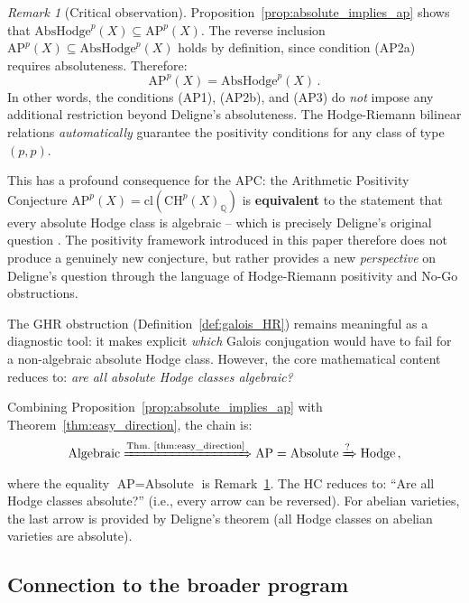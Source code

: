 \documentclass[aps,prd,twocolumn,superscriptaddress,nofootinbib]{revtex4-2}
\theoremstyle{definition}
\theoremstyle{remark}
\newtheorem{remark}[theorem]{Remark}
\begin{document}
\begin{remark}[Critical observation]
\label{rem:ap_equals_absolute}
Proposition~\ref{prop:absolute_implies_ap} shows that $\mathrm{AbsHodge}^p(X) \subseteq \mathrm{AP}^p(X)$. The reverse inclusion $\mathrm{AP}^p(X) \subseteq \mathrm{AbsHodge}^p(X)$ holds by definition, since condition (AP2a) requires absoluteness. Therefore:
\begin{equation}
\mathrm{AP}^p(X) = \mathrm{AbsHodge}^p(X)\,.
\end{equation}
In other words, the conditions (AP1), (AP2b), and (AP3) do \textit{not} impose any additional restriction beyond Deligne's absoluteness. The Hodge-Riemann bilinear relations \textit{automatically} guarantee the positivity conditions for any class of type $(p,p)$.

This has a profound consequence for the APC: the Arithmetic Positivity Conjecture $\mathrm{AP}^p(X) = \mathrm{cl}(\mathrm{CH}^p(X)_\mathbb{Q})$ is \textbf{equivalent} to the statement that every absolute Hodge class is algebraic -- which is precisely Deligne's original question \cite{Deligne1982}. The positivity framework introduced in this paper therefore does not produce a genuinely new conjecture, but rather provides a new \textit{perspective} on Deligne's question through the language of Hodge-Riemann positivity and No-Go obstructions.

The GHR obstruction (Definition~\ref{def:galois_HR}) remains meaningful as a diagnostic tool: it makes explicit \textit{which} Galois conjugation would have to fail for a non-algebraic absolute Hodge class. However, the core mathematical content reduces to: \textit{are all absolute Hodge classes algebraic?}
\end{remark}

Combining Proposition~\ref{prop:absolute_implies_ap} with Theorem~\ref{thm:easy_direction}, the chain is:
\begin{equation}
\text{Algebraic} \xRightarrow{\text{Thm.~\ref{thm:easy_direction}}} \text{AP} = \text{Absolute} \xRightarrow{\text{?}} \text{Hodge}\,,
\end{equation}
where the equality $\text{AP} = \text{Absolute}$ is Remark~\ref{rem:ap_equals_absolute}. The HC reduces to: ``Are all Hodge classes absolute?'' (i.e., every arrow can be reversed). For abelian varieties, the last arrow is provided by Deligne's theorem (all Hodge classes on abelian varieties are absolute).

\subsection{Connection to the broader program}
\end{document}
